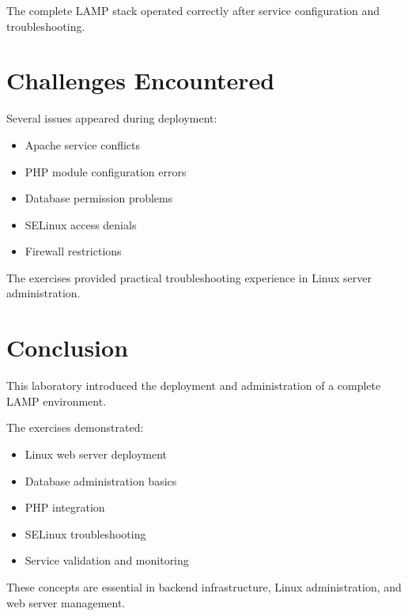 \documentclass[11pt,a4paper]{article}
\begin{document}
The complete LAMP stack operated correctly after service configuration and troubleshooting.

\section{Challenges Encountered}

Several issues appeared during deployment:
\begin{itemize}
    \item Apache service conflicts
    \item PHP module configuration errors
    \item Database permission problems
    \item SELinux access denials
    \item Firewall restrictions
\end{itemize}

The exercises provided practical troubleshooting experience in Linux server administration.

\section{Conclusion}

This laboratory introduced the deployment and administration of a complete LAMP environment.

The exercises demonstrated:
\begin{itemize}
    \item Linux web server deployment
    \item Database administration basics
    \item PHP integration
    \item SELinux troubleshooting
    \item Service validation and monitoring
\end{itemize}

These concepts are essential in backend infrastructure, Linux administration, and web server management.
\end{document}
